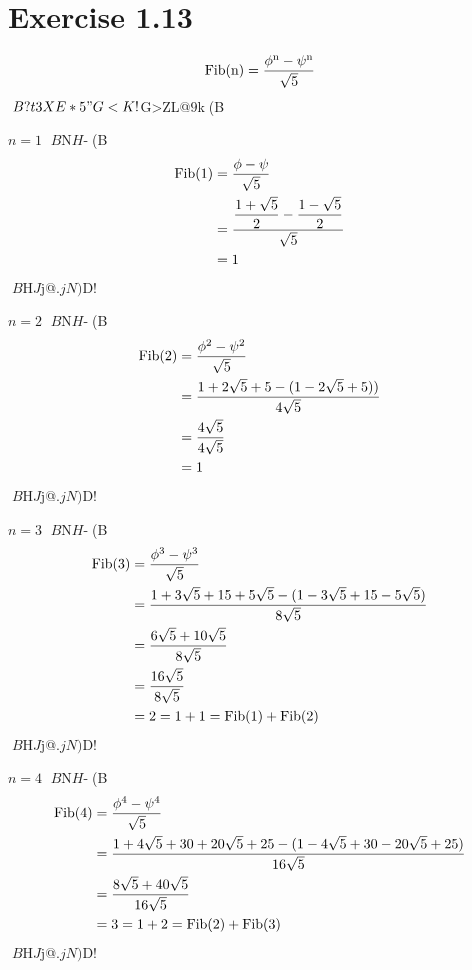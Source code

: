 \documentclass{jarticle}
\begin{document}
 \section{Exercise 1.13}
 \begin{equation}
  \rm{Fib}(n) = \dfrac{\phi^n-\psi^n}{\sqrt{5}}
 \end{equation}
 $B?t3XE*5"G<K!$G>ZL@$9$k(B

 $n=1$ $B$N$H$-(B
 \begin{align}
  \rm{Fib}(1)
  &= \dfrac{\phi-\psi}{\sqrt{5}} \\
  &= \dfrac{\dfrac{1+\sqrt{5}}{2} - \dfrac{1-\sqrt{5}}{2}}{\sqrt{5}} \\
  &= 1
 \end{align}
 $B$H$J$j@.$jN)$D!%

 $n=2$ $B$N$H$-(B
 \begin{align}
  \rm{Fib}(2)
  &= \dfrac{\phi^2-\psi^2}{\sqrt{5}} \\
  &= \dfrac{1+2\sqrt5+5 - (1-2\sqrt5+5))}{4\sqrt{5}} \\
  &= \dfrac{4\sqrt{5}}{4\sqrt5} \\
  &= 1
 \end{align}
 $B$H$J$j@.$jN)$D!%

 $n=3$ $B$N$H$-(B
 \begin{align}
  \rm{Fib}(3)
  &= \dfrac{\phi^3 - \psi^3}{\sqrt5} \\
  &= \dfrac{1 + 3\sqrt5 + 15 + 5\sqrt5 -
  (1 - 3\sqrt5 + 15 - 5\sqrt5)}{8\sqrt5} \\
  &= \dfrac{6\sqrt5 + 10\sqrt5}{8\sqrt5} \\
  &= \dfrac{16\sqrt5}{8\sqrt5} \\
  &= 2 = 1 + 1 = \rm{Fib}(1) + \rm{Fib}(2)
 \end{align}
 $B$H$J$j@.$jN)$D!%

 $n=4$ $B$N$H$-(B
 \begin{align}
  \rm{Fib}(4)
  &= \dfrac{\phi^4 - \psi^4}{\sqrt5} \\
  &= \dfrac{1 + 4\sqrt5 + 30 + 20\sqrt5 + 25
  - (1 - 4\sqrt5 + 30 - 20\sqrt5 + 25)}{16\sqrt5} \\
  &= \dfrac{8\sqrt5 + 40\sqrt5}{16\sqrt5} \\
  &= 3 = 1 + 2 = \rm{Fib}(2) + \rm{Fib}(3)
 \end{align}
 $B$H$J$j@.$jN)$D!%
\end{document}
